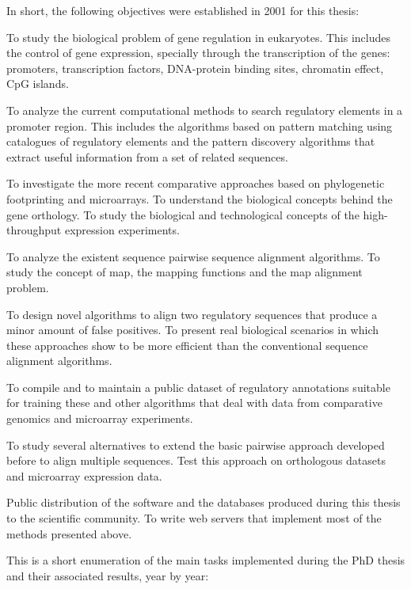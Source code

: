 \noindent In short, the following objectives were established in 2001 for this thesis:

\begin{menumerate}
\item
To study the biological problem of gene regulation in eukaryotes. This includes the control of gene 
expression, specially through the transcription of the genes: promoters, transcription factors, 
DNA-protein binding sites, chromatin effect, CpG islands.
\item
To analyze the current computational methods to search regulatory elements in a promoter region. This 
includes the algorithms based on pattern matching using catalogues of regulatory elements and the 
pattern discovery algorithms that extract useful information from a set of related sequences.
\item
To investigate the more recent comparative approaches based on phylogenetic footprinting and 
microarrays. To understand the biological concepts behind the gene orthology. To study the biological 
and technological concepts of the high-throughput expression experiments.
\item
To analyze the existent sequence pairwise sequence alignment algorithms. To study the concept
of map, the mapping functions and the map alignment problem.
\item
To design novel algorithms to align two regulatory sequences that produce a minor amount of false 
positives. To present real biological scenarios in which these approaches show to be more efficient 
than the conventional sequence alignment algorithms.
\item
To compile and to maintain a public dataset of regulatory annotations suitable for training these
and other algorithms that deal with data from comparative genomics and microarray experiments.
\item
To study several alternatives to extend the basic pairwise approach developed before to align
multiple sequences. Test this approach on orthologous datasets and microarray expression data.
\item
Public distribution of the software and the databases produced during this thesis to the 
scientific community. To write web servers that implement most of the methods presented above.
\end{menumerate}


% 

This is a short enumeration of the main tasks implemented during the PhD thesis and their 
associated results, year by year:

